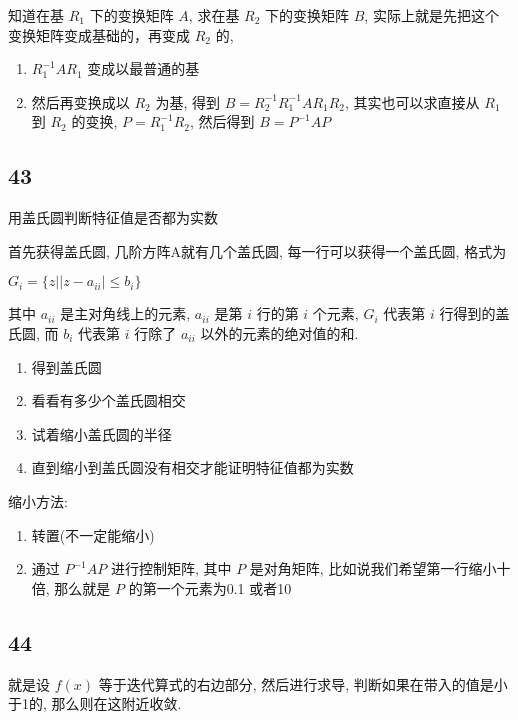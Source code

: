\documentclass[a4paper, draft]{article}
\begin{document}
知道在基 $R_1$ 下的变换矩阵 $A$, 求在基 $R_2$ 下的变换矩阵 $B$, 实际上就是先把这个变换矩阵变成基础的，再变成 $R_2$ 的, 

\begin{enumerate}
    \item $R_1^{-1}AR_1$ 变成以最普通的基
    \item 然后再变换成以 $R_2$ 为基, 
    得到 $B=R_2^{-1}R_1^{-1}AR_1R_2$, 
    其实也可以求直接从 $R_1$ 到 $R_2$ 的变换, 
    $P=R_1^{-1}R_2$, 然后得到 $B=P^{-1}AP$
\end{enumerate}




\subsection*{43}

用盖氏圆判断特征值是否都为实数

首先获得盖氏圆, 几阶方阵A就有几个盖氏圆, 每一行可以获得一个盖氏圆, 格式为

$G_i=\{z||z-a_{ii}|\leqslant b_i\}$

其中 $a_{ii}$ 是主对角线上的元素, $a_{ii}$ 是第 $i$ 行的第 $i$ 个元素, $G_i$ 代表第 $i$ 行得到的盖氏圆, 而 $b_i$ 代表第 $i$ 行除了 $a_{ii}$ 以外的元素的绝对值的和.

\begin{enumerate}
    \item 得到盖氏圆
    \item  看看有多少个盖氏圆相交
    \item 试着缩小盖氏圆的半径
    \item 直到缩小到盖氏圆没有相交才能证明特征值都为实数
\end{enumerate}

缩小方法:

\begin{enumerate}
    \item 转置(不一定能缩小)
    \item 通过 $P^{-1}AP$ 进行控制矩阵, 其中 $P$ 是对角矩阵, 
    比如说我们希望第一行缩小十倍, 那么就是 $P$ 的第一个元素为0.1 或者10 
\end{enumerate}




\subsection*{44}

就是设 $f(x)$ 等于迭代算式的右边部分, 然后进行求导, 
判断如果在带入的值是小于1的, 那么则在这附近收敛.
\end{document}
